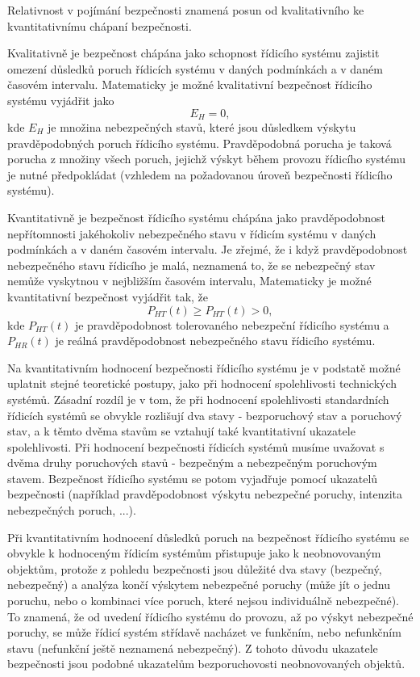 {    Relativnost v pojímání bezpečnosti znamená posun od kvalitativního ke kvantitativnímu chápaní
    bezpečnosti.

    Kvalitativně je bezpečnost chápána jako schopnost řídicího systému zajistit omezení důsledků 
    poruch řídicích systému v daných podmínkách a v daném časovém intervalu. Matematicky je možné 
    kvalitativní bezpečnost řídicího systému vyjádřit jako 
    \begin{equation}
      E_H = 0,
    \end{equation}
    kde \(E_H\) je množina nebezpečných stavů, které jsou důsledkem výskytu pravděpodobných poruch 
    řídicího systému. Pravděpodobná porucha je taková porucha z množiny všech poruch, jejichž 
    výskyt během provozu řídicího systému je nutné předpokládat (vzhledem na požadovanou úroveň 
    bezpečnosti řídicího systému).
	
    Kvantitativně je bezpečnost řídicího systému chápána jako pravděpodobnost nepřítomnosti
    jakéhokoliv nebezpečného stavu v řídicím systému v daných podmínkách a v daném časovém
    intervalu. Je zřejmé, že i když pravděpodobnost nebezpečného stavu řídicího je malá, neznamená
    to, že se nebezpečný stav nemůže vyskytnou v nejbližším časovém intervalu, Matematicky je možné
    kvantitativní bezpečnost vyjádřit tak, že
    \begin{equation}
      P_{HT}(t)\geq P_{HT}(t)>0,
    \end{equation}
    kde \(P_{HT}(t)\) je pravděpodobnost tolerovaného nebezpeční řídicího systému a \(P_{HR}(t)\)
    je reálná pravděpodobnost nebezpeč\-ného stavu řídicího systému.
	 
    Na kvantitativním hodnocení bezpečnosti řídicího systému je v podstatě možné uplatnit stejné 
    teoretické postupy, jako při hodnocení spolehlivosti technických systémů. Zásadní rozdíl je v 
    tom, že při hodnocení spolehlivosti standardních řídicích systémů se obvykle rozlišují dva 
    stavy - bezporuchový stav a poruchový stav, a k těmto dvěma stavům se vztahují také 
    kvantitativní ukazatele spolehlivosti. Při hodnocení bezpečnosti řídicích systémů musíme 
    uvažovat s dvěma druhy poruchových stavů - bezpečným a nebezpečným poruchovým stavem. 
    Bezpečnost řídicího systému se potom vyjadřuje pomocí ukazatelů bezpečnosti (například 
    pravděpodobnost výskytu nebezpečné poruchy, intenzita nebezpečných poruch, ...).

    Při kvantitativním hodnocení důsledků poruch na bezpečnost řídicího systému se obvykle k 
    hodnoceným řídicím systémům přistupuje jako k neobnovovaným objektům, protože z pohledu 
    bezpečnosti jsou důležité dva stavy (bezpečný, nebezpečný) a analýza končí výskytem nebezpečné 
    poruchy (může jít o jednu poruchu, nebo o kombinaci více poruch, které nejsou individuálně 
    nebezpečné). To znamená, že od uvedení řídicího systému do provozu, až po výskyt nebezpečné 
    poruchy, se může řídicí systém střídavě nacházet ve funkčním, nebo nefunkčním stavu (nefunkční 
    ještě neznamená nebezpečný). Z tohoto důvodu ukazatele bezpečnosti jsou podobné ukazatelům 
    bezporuchovosti neobnovovaných objektů. 
  
}
